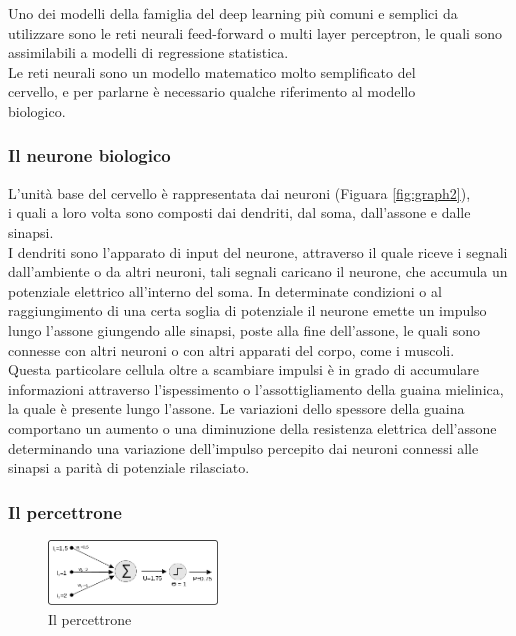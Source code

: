 \documentclass[10pt,a4paper]{article}
\begin{document}
Uno dei modelli della famiglia del deep learning più comuni e semplici da utilizzare sono le reti neurali feed-forward o multi layer perceptron, le quali sono assimilabili a modelli di regressione statistica.\\
Le reti neurali sono un modello matematico molto semplificato del\\ cervello, e per parlarne è necessario qualche riferimento al modello \\biologico.

\subsubsection*{Il neurone biologico}
L'unità base del cervello è rappresentata dai neuroni (Figuara \ref{fig:graph2}),\\ i quali a loro volta sono composti dai dendriti, dal soma, dall'assone e dalle sinapsi. 
\\I dendriti sono l'apparato di input del neurone, attraverso il quale riceve i segnali dall'ambiente o da altri neuroni, tali segnali caricano il neurone, che accumula un potenziale elettrico all'interno del soma.
In determinate condizioni o al raggiungimento di una certa soglia di potenziale il neurone emette un impulso lungo l'assone giungendo alle sinapsi, poste alla fine dell'assone, le quali sono connesse con altri neuroni o con altri apparati del corpo, come i muscoli.\\
Questa particolare cellula oltre a scambiare impulsi è in grado di accumulare informazioni attraverso l'ispessimento o l'assottigliamento della guaina mielinica, la quale è presente lungo l'assone.
Le variazioni dello spessore della guaina comportano un aumento o una diminuzione della resistenza elettrica dell'assone determinando una variazione dell'impulso percepito dai neuroni connessi alle sinapsi a parità di potenziale rilasciato.   

\newpage

\subsubsection*{Il percettrone} 

\begin{figure}
	\centering
	\vspace{-15pt}
    \includegraphics[width=0.4\textwidth]{percettrone.png}
  	\caption{Il percettrone}
  	\label{fig:graph3}
\end{figure}
\end{document}
